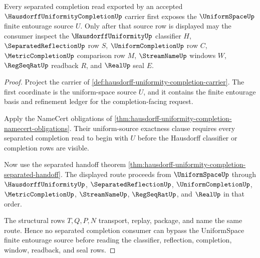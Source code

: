 \begin{theorem}
\label{thm:hausdorff-uniformity-completion-uniform-space-route}
Every separated completion read exported by an accepted $\HausdorffUniformityCompletionUp$ carrier first exposes the $\UniformSpaceUp$ finite entourage source $U$. Only after that source row is displayed may the consumer inspect the $\HausdorffUniformityUp$ classifier $H$, $\SeparatedReflectionUp$ row $S$, $\UniformCompletionUp$ row $C$, $\MetricCompletionUp$ comparison row $M$, $\StreamNameUp$ windows $W$, $\RegSeqRatUp$ readback $R$, and $\RealUp$ seal $E$.
\end{theorem}
\begin{proof}
Project the carrier of \autoref{def:hausdorff-uniformity-completion-carrier}. The first coordinate is the uniform-space source $U$, and it contains the finite entourage basis and refinement ledger for the completion-facing request.

Apply the NameCert obligations of \autoref{thm:hausdorff-uniformity-completion-namecert-obligations}. Their uniform-source exactness clause requires every separated completion read to begin with $U$ before the Hausdorff classifier or completion rows are visible.

Now use the separated handoff theorem \autoref{thm:hausdorff-uniformity-completion-separated-handoff}. The displayed route proceeds from $\UniformSpaceUp$ through $\HausdorffUniformityUp$, $\SeparatedReflectionUp$, $\UniformCompletionUp$, $\MetricCompletionUp$, $\StreamNameUp$, $\RegSeqRatUp$, and $\RealUp$ in that order.

The structural rows $T,Q,P,N$ transport, replay, package, and name the same route. Hence no separated completion consumer can bypass the UniformSpace finite entourage source before reading the classifier, reflection, completion, window, readback, and seal rows.
\end{proof}


